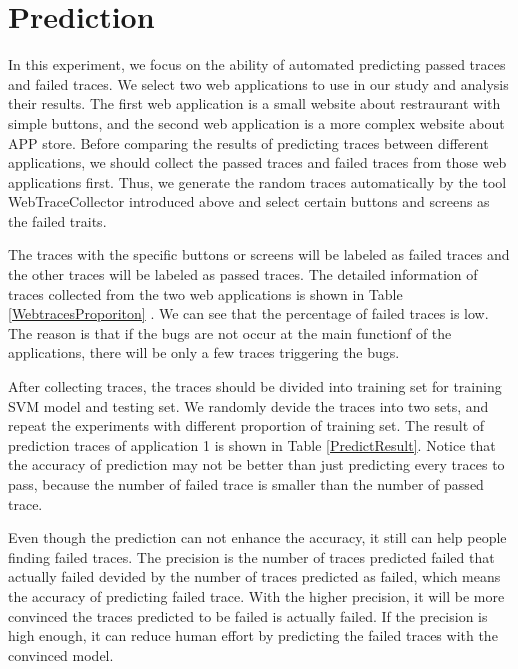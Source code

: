 
\clearpage

\section{Prediction}

In this experiment, we focus on the ability of automated predicting passed traces and failed traces.
We select two web applications to use in our study and analysis their results.
The first web application is a small website about restraurant with simple buttons, 
and the second web application is a more complex website about APP store.
Before comparing the results of predicting traces between different applications,
we should collect the passed traces and failed traces from those web applications first.
Thus, we generate the random traces automatically by the tool WebTraceCollector introduced above
and select certain buttons and screens as the failed traits.

The traces with the specific buttons or screens will be labeled as failed traces and the other traces will be labeled as passed traces.
The detailed information of traces collected from the two web applications is shown in Table \ref{WebtracesProporiton} .
We can see that the percentage of failed traces is low.
The reason is that if the bugs are not occur at the main functionf of the applications,
there will be only a few traces triggering the bugs.

After collecting traces, the traces should be divided into training set for training SVM model and testing set.
We randomly devide the traces into two sets,
and repeat the experiments with different proportion of training set.
The result of prediction traces of application 1 is shown in Table \ref{PredictResult}.
Notice that the accuracy of prediction may not be better than just predicting every traces to pass,
because the number of failed trace is smaller than the number of passed trace.

Even though the prediction can not enhance the accuracy,
it still can help people finding failed traces.
The precision is the number of traces predicted failed that actually failed devided by the number of traces predicted as failed, 
which means the accuracy of predicting failed trace.
With the higher precision, it will be more convinced the traces predicted to be failed is actually failed.
If the precision is high enough, it can reduce human effort by predicting the failed traces with the convinced model.

